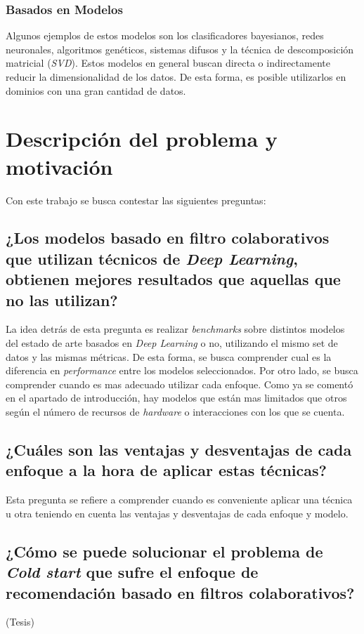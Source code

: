 \documentclass[11pt,a4paper,twoside]{thesis}
\begin{document}
\subsubsection{Basados en Modelos}

Algunos ejemplos de estos modelos son los clasificadores bayesianos, redes
neuronales, algoritmos genéticos, sistemas difusos y la técnica de
descomposición matricial (\textit{SVD}). Estos modelos en general buscan
directa o indirectamente reducir la dimensionalidad de los datos. De esta
forma, es posible utilizarlos en dominios con una gran cantidad de datos.

\clearpage
\section{Descripción del problema y motivación}

Con este trabajo se busca contestar las siguientes preguntas:

\subsection{¿Los modelos basado en filtro colaborativos que utilizan técnicos de \textit{Deep Learning}, obtienen mejores resultados que aquellas que no las utilizan?}

La idea detrás de esta pregunta es realizar \textit{benchmarks} sobre distintos
modelos del estado de arte basados en \textit{Deep Learning} o no, utilizando
el mismo set de datos y las mismas métricas. De esta forma, se busca comprender
cual es la diferencia en \textit{performance} entre los modelos seleccionados.
Por otro lado, se busca comprender cuando es mas adecuado utilizar cada
enfoque. Como ya se comentó en el apartado de introducción, hay modelos que
están mas limitados que otros según el número de recursos de \textit{hardware}
o interacciones con los que se cuenta.

\subsection{¿Cuáles son las ventajas y desventajas de cada enfoque a la hora de aplicar estas técnicas?}

Esta pregunta se refiere a comprender cuando es conveniente aplicar una técnica
u otra teniendo en cuenta las ventajas y desventajas de cada enfoque y modelo.

\subsection{¿Cómo se puede solucionar el problema de \textit{Cold start} que sufre el enfoque de recomendación basado en filtros colaborativos?} (Tesis)
\end{document}
